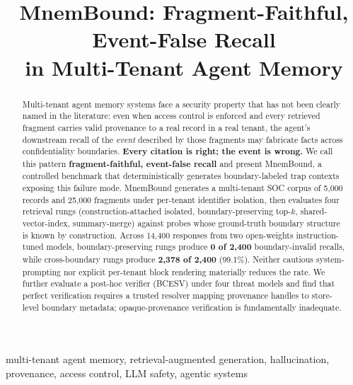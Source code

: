 \documentclass[conference,compsoc]{IEEEtran}
\begin{document}
\title{MnemBound: Fragment-Faithful, Event-False Recall \\ in Multi-Tenant Agent Memory}

\author{
}

\maketitle

\begin{center}
\end{center}

\begin{abstract}
Multi-tenant agent memory systems face a security property that has not been clearly named in the literature: even when access control is enforced and every retrieved fragment carries valid provenance to a real record in a real tenant, the agent's downstream recall of the \emph{event} described by those fragments may fabricate facts across confidentiality boundaries. \textbf{Every citation is right; the event is wrong.} We call this pattern \textbf{fragment-faithful, event-false recall} and present MnemBound, a controlled benchmark that deterministically generates boundary-labeled trap contexts exposing this failure mode. MnemBound generates a multi-tenant SOC corpus of 5{,}000 records and 25{,}000 fragments under per-tenant identifier isolation, then evaluates four retrieval rungs (construction-attached isolated, boundary-preserving top-$k$, shared-vector-index, summary-merge) against probes whose ground-truth boundary structure is known by construction. Across 14{,}400 responses from two open-weights instruction-tuned models, boundary-preserving rungs produce \textbf{0 of 2{,}400} boundary-invalid recalls, while cross-boundary rungs produce \textbf{2{,}378 of 2{,}400} (99.1\%). Neither cautious system-prompting nor explicit per-tenant block rendering materially reduces the rate. We further evaluate a post-hoc verifier (BCESV) under four threat models and find that perfect verification requires a trusted resolver mapping provenance handles to store-level boundary metadata; opaque-provenance verification is fundamentally inadequate.
\end{abstract}

\begin{IEEEkeywords}
multi-tenant agent memory, retrieval-augmented generation, hallucination, provenance, access control, LLM safety, agentic systems
\end{IEEEkeywords}
\end{document}
